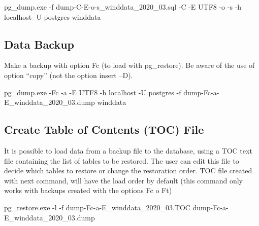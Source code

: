 \documentclass[12pt,twoside]{reedthesis}
\newenvironment{Shaded}{\begin{snugshade}}{\end{snugshade}}
\newcommand{\ExtensionTok}[1]{#1}
\newcommand{\NormalTok}[1]{#1}
\begin{document}
\vspace{0.4cm}
\begin{Shaded}
\begin{Highlighting}[]
      \ExtensionTok{pg_dump.exe}\NormalTok{ -f dump-C-E-o-s_winddata_2020_03.sql -C -E UTF8 -o -s -h localhost -U postgres winddata}
\end{Highlighting}
\end{Shaded}
\normalsize

\hypertarget{data-backup}{%
\subsection{Data Backup}\label{data-backup}}

Make a backup with option Fc (to load with pg\_restore). Be aware of the use of option ``copy'' (not the option insert --D).

\scriptsize

\vspace{0.4cm}
\begin{Shaded}
\begin{Highlighting}[]
      \ExtensionTok{pg_dump.exe}\NormalTok{ -Fc -a -E UTF8 -h localhost -U postgres -f dump-Fc-a-E_winddata_2020_03.dump winddata}
\end{Highlighting}
\end{Shaded}
\normalsize

\hypertarget{create-table-of-contents-toc-file}{%
\subsection{Create Table of Contents (TOC) File}\label{create-table-of-contents-toc-file}}

It is possible to load data from a backup file to the database, using a TOC text file containing the list of tables to be restored. The user can edit this file to decide which tables to restore or change the restoration order. TOC file created with next command, will have the load order by default (this command only works with backups created with the options Fc o Ft)

\scriptsize

\vspace{0.4cm}
\begin{Shaded}
\begin{Highlighting}[]
      \ExtensionTok{pg_restore.exe}\NormalTok{ -l -f dump-Fc-a-E_winddata_2020_03.TOC dump-Fc-a-E_winddata_2020_03.dump}
\end{Highlighting}
\end{Shaded}
\normalsize
\end{document}
